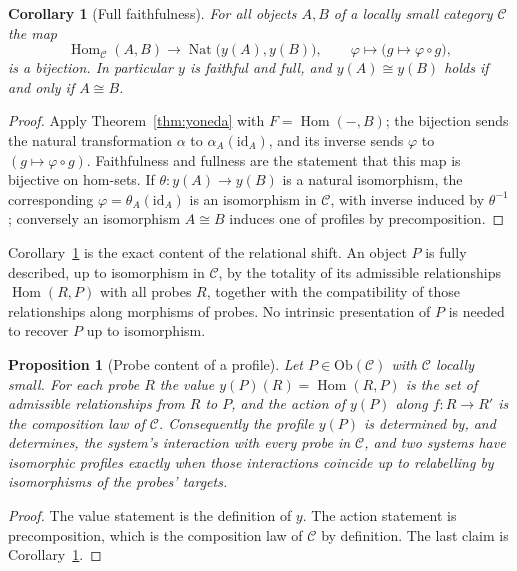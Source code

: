 \documentclass[11pt,letterpaper]{article}
\DeclareMathOperator{\Hom}{Hom}
\DeclareMathOperator{\Nat}{Nat}
\newtheorem{proposition}[theorem]{Proposition}
\newtheorem{corollary}[theorem]{Corollary}
\theoremstyle{definition}
\theoremstyle{remark}
\begin{document}
\begin{corollary}[Full faithfulness]
\label{cor:faithful}
For all objects $A, B$ of a locally small category $\mathcal{C}$ the map
\[
\Hom_{\mathcal{C}}(A, B) \longrightarrow \Nat\big(y(A), y(B)\big),
\qquad
\varphi \longmapsto \big(g \mapsto \varphi \circ g\big),
\]
is a bijection. In particular $y$ is faithful and full, and $y(A) \cong y(B)$ holds if and only if $A \cong B$.
\end{corollary}

\begin{proof}
Apply Theorem~\ref{thm:yoneda} with $F = \Hom(-, B)$; the bijection sends the natural transformation $\alpha$ to $\alpha_A(\mathrm{id}_A)$, and its inverse sends $\varphi$ to $(g \mapsto \varphi \circ g)$. Faithfulness and fullness are the statement that this map is bijective on hom-sets. If $\theta \colon y(A) \to y(B)$ is a natural isomorphism, the corresponding $\varphi = \theta_A(\mathrm{id}_A)$ is an isomorphism in $\mathcal{C}$, with inverse induced by $\theta^{-1}$; conversely an isomorphism $A \cong B$ induces one of profiles by precomposition.
\end{proof}

Corollary~\ref{cor:faithful} is the exact content of the relational shift. An object $P$ is fully described, up to isomorphism in $\mathcal{C}$, by the totality of its admissible relationships $\Hom(R, P)$ with all probes $R$, together with the compatibility of those relationships along morphisms of probes. No intrinsic presentation of $P$ is needed to recover $P$ up to isomorphism.

\begin{proposition}[Probe content of a profile]
\label{prop:probe}
Let $P \in \mathrm{Ob}(\mathcal{C})$ with $\mathcal{C}$ locally small. For each probe $R$ the value $y(P)(R) = \Hom(R, P)$ is the set of admissible relationships from $R$ to $P$, and the action of $y(P)$ along $f \colon R \to R'$ is the composition law of $\mathcal{C}$. Consequently the profile $y(P)$ is determined by, and determines, the system's interaction with every probe in $\mathcal{C}$, and two systems have isomorphic profiles exactly when those interactions coincide up to relabelling by isomorphisms of the probes' targets.
\end{proposition}

\begin{proof}
The value statement is the definition of $y$. The action statement is precomposition, which is the composition law of $\mathcal{C}$ by definition. The last claim is Corollary~\ref{cor:faithful}.
\end{proof}
\end{document}
